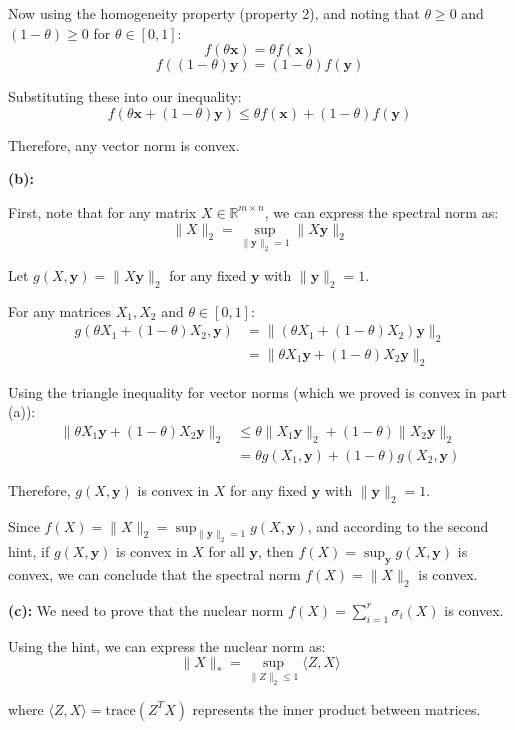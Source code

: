 Now using the homogeneity property (property 2), and noting that $\theta \geq 0$ and $(1-\theta) \geq 0$ for $\theta\in[0,1]$:
$$f(\theta\mathbf{x}) = \theta f(\mathbf{x})$$
$$f((1-\theta)\mathbf{y}) = (1-\theta)f(\mathbf{y})$$

Substituting these into our inequality:
$$f(\theta\mathbf{x}+(1-\theta)\mathbf{y}) \leq \theta f(\mathbf{x})+(1-\theta)f(\mathbf{y})$$

Therefore, any vector norm is convex.

\textbf{(b):} 

First, note that for any matrix $X \in \mathbb{R}^{m \times n}$, we can express the spectral norm as:
$$\|X\|_2 = \sup_{\|\mathbf{y}\|_2 = 1} \|X\mathbf{y}\|_2$$

Let $g(X,\mathbf{y}) = \|X\mathbf{y}\|_2$ for any fixed $\mathbf{y}$ with $\|\mathbf{y}\|_2 = 1$.

For any matrices $X_1, X_2$ and $\theta \in [0,1]$:
\begin{align*}
g(\theta X_1 + (1-\theta)X_2, \mathbf{y}) &= \|(\theta X_1 + (1-\theta)X_2)\mathbf{y}\|_2 \\
&= \|\theta X_1\mathbf{y} + (1-\theta)X_2\mathbf{y}\|_2
\end{align*}

Using the triangle inequality for vector norms (which we proved is convex in part (a)):
\begin{align*}
\|\theta X_1\mathbf{y} + (1-\theta)X_2\mathbf{y}\|_2 &\leq \theta\|X_1\mathbf{y}\|_2 + (1-\theta)\|X_2\mathbf{y}\|_2 \\
&= \theta g(X_1,\mathbf{y}) + (1-\theta)g(X_2,\mathbf{y})
\end{align*}

Therefore, $g(X,\mathbf{y})$ is convex in $X$ for any fixed $\mathbf{y}$ with $\|\mathbf{y}\|_2 = 1$.

Since $f(X) = \|X\|_2 = \sup_{\|\mathbf{y}\|_2 = 1} g(X,\mathbf{y})$, and according to the second hint, if $g(X,\mathbf{y})$ is convex in $X$ for all $\mathbf{y}$, then $f(X)=\sup_{\mathbf{y}}g(X,\mathbf{y})$ is convex, we can conclude that the spectral norm $f(X) = \|X\|_2$ is convex.

\textbf{(c):} We need to prove that the nuclear norm $f(X) = \sum_{i=1}^{r} \sigma_i(X)$ is convex.

Using the hint, we can express the nuclear norm as:
$$\|X\|_* = \sup_{\|Z\|_2 \leq 1} \langle Z, X \rangle$$

where $\langle Z, X \rangle = \text{trace}(Z^T X)$ represents the inner product between matrices.

